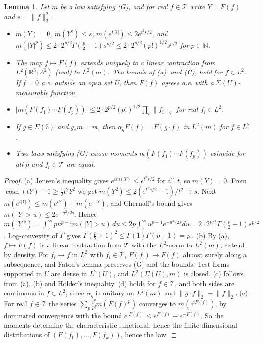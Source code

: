\documentclass[11pt]{amsart}
\theoremstyle{plain}
\newtheorem{lemma}[theorem]{Lemma}
\theoremstyle{definition}
\theoremstyle{remark}
\numberwithin{equation}{section}
\newcommand{\R}{\mathbb{R}}
\newcommand{\N}{\mathbb{N}}
\newcommand{\cT}{\mathcal{T}}
\newcommand{\Eu}{E(3)}
\newcommand{\abs}[1]{\lvert #1\rvert}
\newcommand{\norm}[1]{\lVert #1\rVert}
\begin{document}
\begin{lemma}\label{lem:B-G}
Let $m$ be a law satisfying (G), and for real $f\in\cT$ write $Y=F(f)$ and $s=\norm f_2^2$.
\begin{itemize}
\item[(a)] $m(Y)=0$, $m(Y^2)\le s$, $m(e^{t\abs Y})\le2e^{t^2s/2}$, and $m(\abs Y^p)\le2\cdot2^{p/2}\Gamma(\frac p2+1)s^{p/2}\le2\cdot2^{p/2}(p!)^{1/2}s^{p/2}$ for $p\in\N$.
\item[(b)] The map $f\mapsto F(f)$ extends uniquely to a linear contraction from $L^2(\R^3;\Lambda^2)$ (real) to $L^2(m)$. The bounds of (a), and (G), hold for $f\in L^2$. If $f=0$ a.e. outside an open set $U$, then $F(f)$ agrees a.e. with a $\Sigma(U)$-measurable function.
\item[(c)] $\abs{m(F(f_1)\cdots F(f_p))}\le2\cdot2^{p/2}(p!)^{1/2}\prod_i\norm{f_i}_2$ for real $f_i\in L^2$.
\item[(d)] If $g\in\Eu$ and $g_*m=m$, then $\alpha_gF(f)=F(g\cdot f)$ in $L^2(m)$ for $f\in L^2$.
\item[(e)] Two laws satisfying (G) whose moments $m(F(f_1)\cdots F(f_p))$ coincide for all $p$ and $f_i\in\cT$ are equal.
\end{itemize}
\end{lemma}

\begin{proof}
(a) Jensen's inequality gives $e^{tm(Y)}\le e^{t^2s/2}$ for all $t$, so $m(Y)=0$. From $\cosh(tY)-1\ge\frac12t^2Y^2$ we get $m(Y^2)\le2(e^{t^2s/2}-1)/t^2\to s$. Next $m(e^{t\abs Y})\le m(e^{tY})+m(e^{-tY})$, and Chernoff's bound gives $m(\abs Y>u)\le2e^{-u^2/2s}$. Hence $m(\abs Y^p)=\int_0^\infty pu^{p-1}m(\abs Y>u)\,du\le2p\int_0^\infty u^{p-1}e^{-u^2/2s}du=2\cdot2^{p/2}\Gamma(\frac p2+1)s^{p/2}$. Log-convexity of $\Gamma$ gives $\Gamma(\frac p2+1)^2\le\Gamma(1)\Gamma(p+1)=p!$.
(b) By (a), $f\mapsto F(f)$ is a linear contraction from $\cT$ with the $L^2$-norm to $L^2(m)$; extend by density. For $f_l\to f$ in $L^2$ with $f_l\in\cT$, $F(f_l)\to F(f)$ almost surely along a subsequence, and Fatou's lemma preserves (G) and the bounds. Test forms supported in $U$ are dense in $L^2(U)$, and $L^2(\Sigma(U),m)$ is closed.
(c) follows from (a), (b) and H\"older's inequality.
(d) holds for $f\in\cT$, and both sides are continuous in $f\in L^2$, since $\alpha_g$ is unitary on $L^2(m)$ and $\norm{g\cdot f}_2=\norm f_2$.
(e) For real $f\in\cT$ the series $\sum_p\frac{i^p}{p!}m(F(f)^p)$ converges to $m(e^{iF(f)})$, by dominated convergence with the bound $e^{\abs{F(f)}}\le e^{F(f)}+e^{-F(f)}$. So the moments determine the characteristic functional, hence the finite-dimensional distributions of $(F(f_1),\dots,F(f_k))$, hence the law.
\end{proof}
\end{document}
